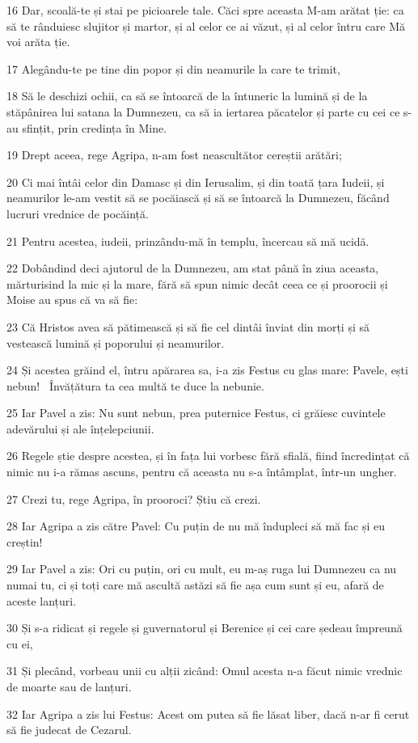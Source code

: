 \par 16 Dar, scoală-te și stai pe picioarele tale. Căci spre aceasta M-am arătat ție: ca să te rânduiesc slujitor și martor, și al celor ce ai văzut, și al celor întru care Mă voi arăta ție.
\par 17 Alegându-te pe tine din popor și din neamurile la care te trimit,
\par 18 Să le deschizi ochii, ca să se întoarcă de la întuneric la lumină și de la stăpânirea lui satana la Dumnezeu, ca să ia iertarea păcatelor și parte cu cei ce s-au sfințit, prin credința în Mine.
\par 19 Drept aceea, rege Agripa, n-am fost neascultător cereștii arătări;
\par 20 Ci mai întâi celor din Damasc și din Ierusalim, și din toată țara Iudeii, și neamurilor le-am vestit să se pocăiască și să se întoarcă la Dumnezeu, făcând lucruri vrednice de pocăință.
\par 21 Pentru acestea, iudeii, prinzându-mă în templu, încercau să mă ucidă.
\par 22 Dobândind deci ajutorul de la Dumnezeu, am stat până în ziua aceasta, mărturisind la mic și la mare, fără să spun nimic decât ceea ce și proorocii și Moise au spus că va să fie:
\par 23 Că Hristos avea să pătimească și să fie cel dintâi înviat din morți și să vestească lumină și poporului și neamurilor.
\par 24 Și acestea grăind el, întru apărarea sa, i-a zis Festus cu glas mare: Pavele, ești nebun!  Învățătura ta cea multă te duce la nebunie.
\par 25 Iar Pavel a zis: Nu sunt nebun, prea puternice Festus, ci grăiesc cuvintele adevărului și ale înțelepciunii.
\par 26 Regele știe despre acestea, și în fața lui vorbesc fără sfială, fiind încredințat că nimic nu i-a rămas ascuns, pentru că aceasta nu s-a întâmplat, într-un ungher.
\par 27 Crezi tu, rege Agripa, în prooroci? Știu că crezi.
\par 28 Iar Agripa a zis către Pavel: Cu puțin de nu mă îndupleci să mă fac și eu creștin!
\par 29 Iar Pavel a zis: Ori cu puțin, ori cu mult, eu m-aș ruga lui Dumnezeu ca nu numai tu, ci și toți care mă ascultă astăzi să fie așa cum sunt și eu, afară de aceste lanțuri.
\par 30 Și s-a ridicat și regele și guvernatorul și Berenice și cei care ședeau împreună cu ei,
\par 31 Și plecând, vorbeau unii cu alții zicând: Omul acesta n-a făcut nimic vrednic de moarte sau de lanțuri.
\par 32 Iar Agripa a zis lui Festus: Acest om putea să fie lăsat liber, dacă n-ar fi cerut să fie judecat de Cezarul.

